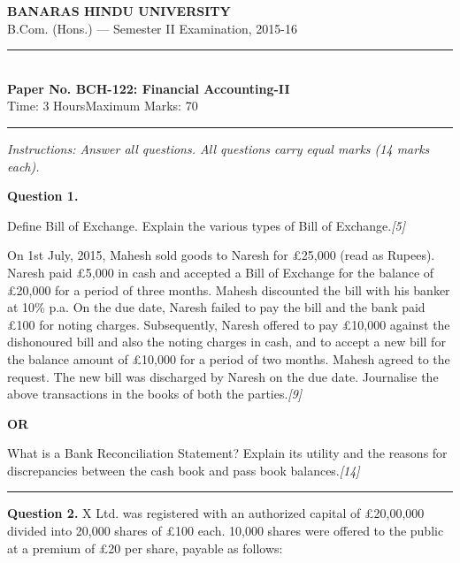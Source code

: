 \documentclass[11pt,a4paper]{article}
\newcommand{\pts}[1]{\hfill   \textit{[#1]}}
\begin{document}
\begin{center}
  {\large\bfseries BANARAS HINDU UNIVERSITY}\\[2pt]
  {\normalsize B.Com. (Hons.) --- Semester II Examination, 2015-16}\\[6pt]
  \rule{0.8\linewidth}{0.5pt}\\[6pt]
  {\large\bfseries Paper No. BCH-122: Financial Accounting-II}\\[4pt]
  {\normalsize Time: 3 Hours\hfill Maximum Marks: 70}
\end{center}

\rule{\linewidth}{0.4pt}

\smallskip



\noindent   \textit{Instructions: Answer all questions. All questions carry equal marks (14 marks each).}

\bigskip




\noindent   \textbf{Question 1.}

\begin{parts}
  \item Define Bill of Exchange. Explain the various types of Bill of Exchange.\pts{5}
  \item On 1st July, 2015, Mahesh sold goods to Naresh for \pounds 25,000 (read as Rupees). Naresh paid \pounds 5,000 in cash and accepted a Bill of Exchange for the balance of \pounds 20,000 for a period of three months. Mahesh discounted the bill with his banker at 10\% p.a. On the due date, Naresh failed to pay the bill and the bank paid \pounds 100 for noting charges. Subsequently, Naresh offered to pay \pounds 10,000 against the dishonoured bill and also the noting charges in cash, and to accept a new bill for the balance amount of \pounds 10,000 for a period of two months. Mahesh agreed to the request. The new bill was discharged by Naresh on the due date. Journalise the above transactions in the books of both the parties.\pts{9}
\end{parts}

\centerline{   \textbf{OR}}

What is a Bank Reconciliation Statement? Explain its utility and the reasons for discrepancies between the cash book and pass book balances.\pts{14}

\medskip\rule{\linewidth}{0.2pt}


\newpage




\noindent   \textbf{Question 2.}
X Ltd. was registered with an authorized capital of \pounds 20,00,000 divided into 20,000 shares of \pounds 100 each. 10,000 shares were offered to the public at a premium of \pounds 20 per share, payable as follows:
\end{document}
